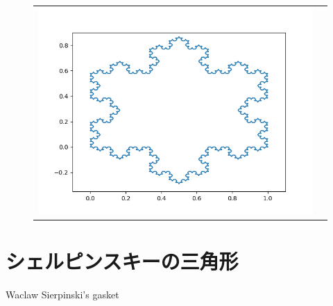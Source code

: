 \documentclass[uplatex,a4paper,11pt,oneside,openany]{jsbook}
\begin{document}
\begin{figure}[H]
  \centering
  \begin{tabular}{cc}
      \begin{minipage}{0.1\hsize}
      \centering
      \end{minipage}
      \begin{minipage}{0.9\hsize}
      \centering
\includegraphics[keepaspectratio,clip,scale=0.7]{../src/figure/figkoch2.png}
      \end{minipage}
    \end{tabular}
\end{figure}%

\newpage

\section{シェルピンスキーの三角形}

Waclaw Sierpinski's gasket
\end{document}
